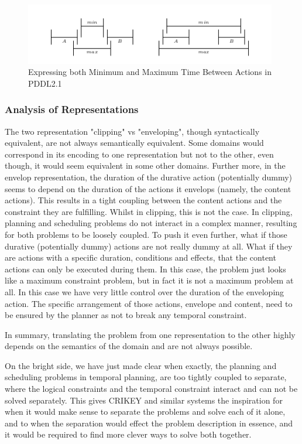 \documentclass
[a4paper
,english
,parskip=half
,bibliography=totoc
]{scrreprt}
\begin{document}
        \begin{figure}[!]
            \centering    
            \includegraphics[width=11cm]{max_min.png}
            \caption{Expressing both Minimum and Maximum Time Between Actions in PDDL2.1}
             \label{fig:maxandmin}
        \end{figure}

        \subsubsection{Analysis of Representations}
        The two representation "clipping" vs "enveloping", though syntactically equivalent, are not always semantically equivalent.
        Some domains would correspond in its encoding to one representation but not to the other, even though, it would seem equivalent in some other domains. Further more, in the envelop representation, the duration of the durative action (potentially dummy) seems to depend on the duration of the actions it envelops (namely, the content actions). This results in a tight coupling between the content actions and the constraint they are fulfilling. Whilst in clipping, this is not the case. In clipping, planning and scheduling problems do not interact in a complex manner, resulting for both problems to be loosely coupled.
        To push it even further, what if those durative (potentially dummy) actions are not really dummy at all. What if they are actions with a specific duration, conditions and effects, that the content actions can only be executed during them. In this case, the problem just looks like a maximum constraint problem, but in fact it is not a maximum problem at all. In this case we have very little control over the duration of the enveloping action. The specific arrangement of those actions, envelope and content, need to be ensured by the planner as not to break any temporal constraint.

         In summary, translating the problem from one representation to the other highly depends on the semantics of the domain and are not always possible.
        
        On the bright side, we have just made clear when exactly, the planning and scheduling problems in temporal planning, are too tightly coupled to separate, where the logical constraints and the temporal constraint interact and can not be solved separately. This gives CRIKEY and similar systems the inspiration for when it would make sense to separate the problems and solve each of it alone, and to when the separation would effect the problem description in essence, and it would be required to find more clever ways to solve both together.
\end{document}
